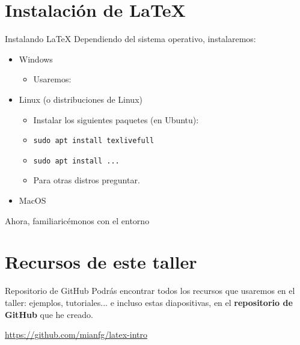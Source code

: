 \documentclass[10pt, xcolor=table]{beamer}
\begin{document}
\section{Instalación de \LaTeX{}}

\begin{frame}{Instalando \LaTeX{}}
	Dependiendo del sistema operativo, instalaremos:
	\begin{itemize}
		\item Windows
		      \begin{itemize}
		      	\item Usaremos: 
		      \end{itemize}
		\item Linux (o distribuciones de Linux)
		      \begin{itemize}
		      	\item Instalar los siguientes paquetes (en Ubuntu):
		      	\item[] \texttt{sudo apt install texlivefull}
		      	\item[] \texttt{sudo apt install ...}
		      	\item Para otras distros preguntar.
		      \end{itemize}
		      
		\item MacOS
	\end{itemize}
\end{frame}

\begin{frame}[standout]
	Ahora, familiaricémonos con el entorno
\end{frame}

\section{Recursos de este taller}

\begin{frame}{Repositorio de GitHub}
	Podrás encontrar todos los recursos que usaremos en el taller: ejemplos, tutoriales... e incluso estas diapositivas, en el \textbf{repositorio de GitHub} que he creado.
	\begin{center}
		\url{https://github.com/mianfg/latex-intro}
	\end{center}
\end{frame}
\end{document}
